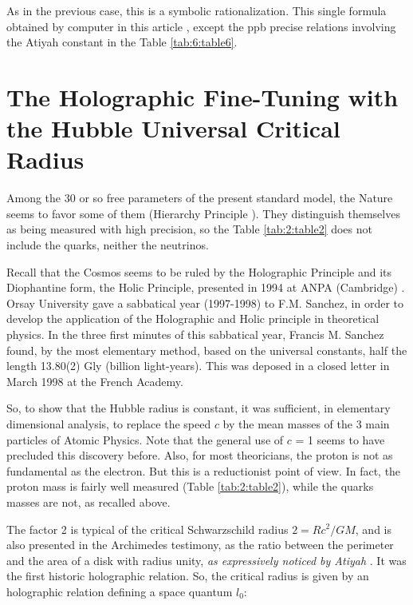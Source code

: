 \documentclass[a4paper,9pt]{article}
\begin{document}
As in the previous case, this is a symbolic rationalization. This single formula obtained by computer in this article \cite{LaGuer}, except the ppb precise relations involving the Atiyah constant in the Table \ref{tab:6:table6}.








\section{The Holographic Fine-Tuning with the Hubble Universal Critical Radius}

Among the 30 or so free parameters of the present standard model, the Nature seems to favor some of them (Hierarchy Principle \cite{Sanchez}). They distinguish themselves as being measured with high precision, so the Table \ref{tab:2:table2} does not include the quarks, neither the neutrinos. 

Recall that the Cosmos seems to be ruled by the Holographic Principle and its Diophantine form, the Holic Principle, presented in 1994 at ANPA (Cambridge)  \cite{Sanchez1}. Orsay University gave a sabbatical year (1997-1998) to F.M. Sanchez, in order to develop the application of the Holographic and Holic principle in theoretical physics. In the three first minutes of this sabbatical year, Francis M. Sanchez found, by the most elementary method, based on the universal constants, half the length 13.80(2) Gly (billion light-years). This was deposed in a closed letter in March 1998 at the French Academy. 


So, to show that the Hubble radius is constant, it was sufficient, in elementary dimensional analysis, to replace the speed $c$ by the mean masses of the 3 main particles of Atomic Physics. Note that the general use of $c$ = 1 seems to have precluded this discovery before. Also, for most theoricians, the proton is not as fundamental as the electron. But this is a reductionist point of view. In fact, the proton mass is fairly well measured (Table \ref{tab:2:table2}), while the quarks masses are not, as recalled above.
 
 
    The factor 2 is typical of the critical Schwarzschild radius $2 = Rc^2/GM$, and is also presented in the Archimedes testimony, as the ratio between the perimeter and the area of a disk with radius unity, \textit {as expressively noticed by Atiyah }. It was the first historic holographic relation. So, the critical radius is given by an holographic relation defining a space quantum $l_0$:
    
\end{document}
